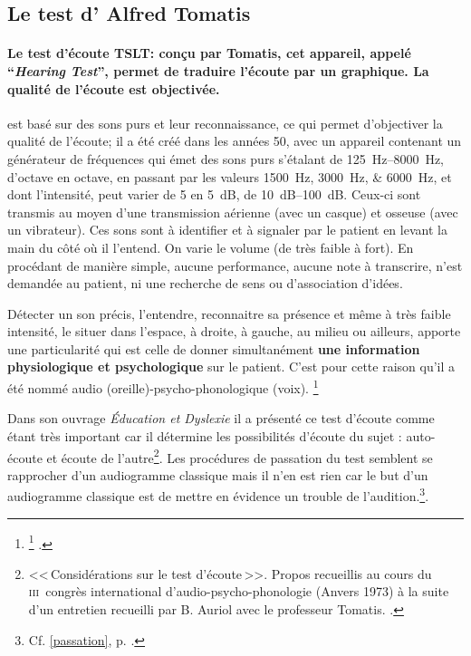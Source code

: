
\subsection{ 
Le test d' Alfred Tomatis}

\paragraph{Le test d'écoute TSLT: conçu par Tomatis,
   cet appareil, appelé ``\emph{Hearing Test}'', permet de traduire l'écoute par 
   un graphique. La
   qualité de l'écoute est objectivée.}

 
est basé sur des sons purs et leur
 reconnaissance, ce qui permet d'objectiver la qualité de l'écoute; il a été créé dans les années 50, avec un
  appareil contenant un générateur de fréquences qui émet des sons
  purs s'étalant de \SIrange{125}{8000}{\Hz}, d'octave en octave, en passant par les valeurs
\SIlist{1500;3000;6000}{\Hz}, et dont l'intensité, peut varier de 5 en \SI{5}{\dB}, de \SIrange{10}{100}{\dB}. 
Ceux-ci sont transmis au moyen d'une
  transmission aérienne (avec un casque) et osseuse (avec un vibrateur). Ces sons sont à identifier et à
  signaler par le patient en levant la main du côté où il l'entend. On
  varie le volume (de très faible à fort). En procédant de manière
  simple, aucune performance, aucune note à transcrire, n'est demandée
  au patient, ni une 
  recherche de sens ou d'association d'idées.
 
 Détecter un son précis, l'entendre, reconnaitre sa présence et même à très
 faible intensité, le situer dans l'espace, à droite, à gauche, au
 milieu ou ailleurs,  apporte une particularité qui est celle de  donner simultanément  \textbf{une information
   physiologique et psychologique} sur le patient.
 C'est pour cette raison qu'il a été nommé
 audio (oreille)-psycho-phonologique (voix). \footnote{\footnote{Avec le professeur Tomatis: formation suivie dès 1995, Boulevard de Courcelles, Centre de l'écoute 
Tomatis à Paris; puis en 2009/11/13/15 avec V. Gas, V. Drouot et J.P. Granier, formateurs et consultants. Source: site internet officiel: \cite{tomatis.com}.}
.}
  
  Dans son ouvrage \emph{Éducation et
    Dyslexie}\autocite{tomatis:education} il
  a présenté ce test d'écoute comme étant très important car il détermine les
  possibilités d'écoute du sujet : auto-écoute et écoute de
  l'autre\footnote{<<\,Considérations sur le test d'écoute\,>>. Propos
  	recueillis au cours du \textsc{iii}\ieme\ congrès international
  	d'audio-psycho-phonologie (Anvers 1973) à la suite d'un entretien recueilli par B. Auriol
  	avec le professeur Tomatis. \autocite{auriol_stress}.}. 
   Les procédures de passation du test semblent
  se rapprocher d'un audiogramme classique mais il n'en est rien car
  le but d'un audiogramme classique  est de mettre en évidence un
  trouble de l'audition.\footnote{Cf. \ref{passation}, p. 
    \pageref{passation}.}.
  


